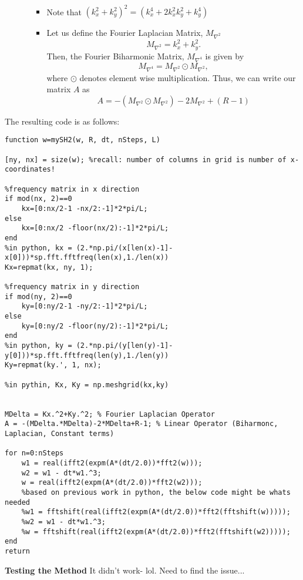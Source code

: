 \documentclass[12pt]{article}
\begin{document}
\begin{itemize}
\begin{enumerate}[(i)]
\begin{itemize}
\begin{multline*}
                \end{multline*}
            \item
                Note that $(k_x^2+k_y^2)^2 = (k_x^4+2k_x^2k_y^2+k_y^4)$
            \item
                Let us define the Fourier Laplacian Matrix, $M_{\nabla^2}$
                \[
                    M_{\nabla^2} = k_x^2+k_y^2.
                \] 
                Then, the Fourier Biharmonic Matrix, $M_{\nabla^4}$ is given by
                \[
                  M_{\nabla^4} = M_{\nabla^2} \odot M_{\nabla^2},
                \] 
                where $\odot$ denotes element wise multiplication.
                Thus, we can write our matrix $A$ as
                \[
                    A = -(M_{\nabla^2} \odot M_{\nabla^2})-2M_{\nabla^2}+(R-1)
                \] 
                \end{itemize}
        \end{enumerate}
\end{itemize}
The resulting code is as follows:
\begin{verbatim}
function w=mySH2(w, R, dt, nSteps, L)

[ny, nx] = size(w); %recall: number of columns in grid is number of x-coordinates!

%frequency matrix in x direction
if mod(nx, 2)==0
    kx=[0:nx/2-1 -nx/2:-1]*2*pi/L;
else
    kx=[0:nx/2 -floor(nx/2):-1]*2*pi/L;
end
%in python, kx = (2.*np.pi/(x[len(x)-1]-x[0]))*sp.fft.fftfreq(len(x),1./len(x))
Kx=repmat(kx, ny, 1);

%frequency matrix in y direction
if mod(ny, 2)==0
    ky=[0:ny/2-1 -ny/2:-1]*2*pi/L;
else
    ky=[0:ny/2 -floor(ny/2):-1]*2*pi/L;
end
%in python, ky = (2.*np.pi/(y[len(y)-1]-y[0]))*sp.fft.fftfreq(len(y),1./len(y))
Ky=repmat(ky.', 1, nx);

%in pythin, Kx, Ky = np.meshgrid(kx,ky)


MDelta = Kx.^2+Ky.^2; % Fourier Laplacian Operator
A = -(MDelta.*MDelta)-2*MDelta+R-1; % Linear Operator (Biharmonc, Laplacian, Constant terms)

for n=0:nSteps
    w1 = real(ifft2(expm(A*(dt/2.0))*fft2(w)));
    w2 = w1 - dt*w1.^3;
    w = real(ifft2(expm(A*(dt/2.0))*fft2(w2)));
    %based on previous work in python, the below code might be whats needed
    %w1 = fftshift(real(ifft2(expm(A*(dt/2.0))*fft2(fftshift(w)))));
    %w2 = w1 - dt*w1.^3;
    %w = fftshift(real(ifft2(expm(A*(dt/2.0))*fft2(fftshift(w2)))));
end
return
\end{verbatim}
\textbf{Testing the Method}
It didn't work- lol. Need to find the issue...
\end{document}
